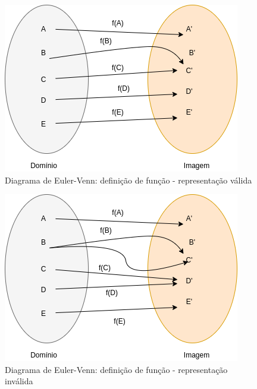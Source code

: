 \begin{multicols*}{2}
    \begin{figure}[H]
        \centering
        \caption{Diagrama de Euler-Venn: definição de função - representação válida}
        \includegraphics[width=0.8\columnwidth]{assets/rafael/img1.png}
    \end{figure}


    \begin{figure}[H]
        \centering
        \caption{Diagrama de Euler-Venn: definição de função - representação inválida}
        \includegraphics[width=0.8\columnwidth]{assets/rafael/img2.png}
    \end{figure}

\end{multicols*}
